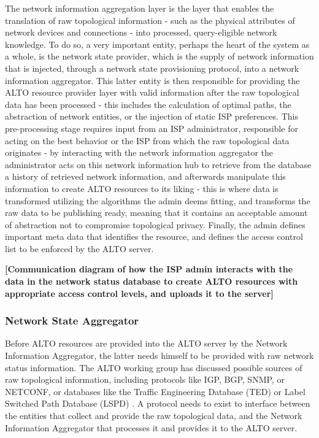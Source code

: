     The network information aggregation layer is the layer that enables the translation of raw topological information - such as the physical attributes of network devices and connections - into processed, query-eligible network knowledge.
    To do so, a very important entity, perhaps the heart of the system as a whole, is the network state provider, which is the supply of network information that is injected, through a network state provisioning protocol, into a network information aggregator.
    This latter entity is then responsible for providing the ALTO resource provider layer with valid information after the raw topological data has been processed - this includes the calculation of optimal paths, the abstraction of network entities, or the injection of static ISP preferences.
    This pre-processing stage requires input from an ISP administrator, responsible for acting on the best behavior or the ISP from which the raw topological data originates - by interacting with the network information aggregator the administrator acts on this network information hub to retrieve from the database a history of retrieved network information, and afterwards manipulate this information to create ALTO resources to its liking - this is where data is transformed utilizing the algorithms the admin deems fitting, and transforms the raw data to be publishing ready, meaning that it contains an acceptable amount of abstraction not to compromise topological privacy.
    Finally, the admin defines important meta data that identifies the resource, and defines the access control list to be enforced by the ALTO server.

    \textbf{[Communication diagram of how the ISP admin interacts with the data in the network status database to create ALTO resources with appropriate access control levels, and uploads it to the server]}

\subsubsection{Network State Aggregator}

    Before ALTO resources are provided into the ALTO server by the Network Information Aggregator, the latter needs himself to be provided with raw network status information.
    The ALTO working group has discussed possible sources of raw topological information, including protocols like IGP, BGP, SNMP, or NETCONF, or databases like the Traffic Engineering Database (TED) or Label Switched Path Database (LSPD) \cite{alto-deployment-considerations}.
    A protocol needs to exist to interface between the entities that collect and provide the raw topological data, and the Network Information Aggregator that processes it and provides it to the ALTO server.

